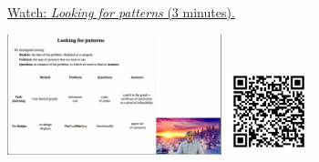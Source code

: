 
\begin{minipage}{10cm}
    \href{https://act4e-spring21.netlify.app/videos/spring2021-functorial-comp-a:patterns.html}{Watch: \emph{Looking for patterns} (3 minutes).}
        
    \href{https://act4e-spring21.netlify.app/videos/spring2021-functorial-comp-a:patterns.html}{\includegraphics[height=3.5cm]{spring2021-functorial-comp-a:patterns/thumbnails.jpg}}
    \href{https://act4e-spring21.netlify.app/videos/spring2021-functorial-comp-a:patterns.html}{\includegraphics[height=2.5cm]{spring2021-functorial-comp-a:patterns/qrcode.png}}
\end{minipage}
